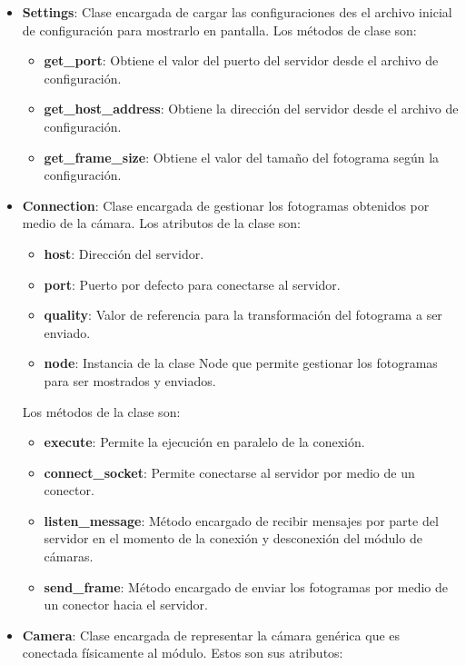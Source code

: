 \begin{itemize}
    \item \textbf{Settings}: Clase encargada de cargar las configuraciones des el archivo inicial de configuración para mostrarlo en pantalla. Los métodos de clase son:
        \begin{itemize}
            \item \textbf{get\_port}: Obtiene el valor del puerto del servidor desde el archivo de configuración.
            \item \textbf{get\_host\_address}: Obtiene la dirección del servidor desde el archivo de configuración.
            \item \textbf{get\_frame\_size}: Obtiene el valor del tamaño del fotograma según la configuración.
        \end{itemize}
    \item \textbf{Connection}: Clase encargada de gestionar los fotogramas obtenidos por medio de la cámara. Los atributos de la clase son:
        \begin{itemize}
            \item \textbf{host}: Dirección del servidor.
            \item \textbf{port}: Puerto por defecto para conectarse al servidor.
            \item \textbf{quality}: Valor de referencia para la transformación del fotograma a ser enviado.
            \item \textbf{node}: Instancia de la clase Node  que permite gestionar los fotogramas para ser mostrados y enviados.
        \end{itemize}
        Los métodos de la clase son:
        \begin{itemize}
            \item \textbf{execute}: Permite la ejecución en paralelo de la conexión.
            \item \textbf{connect\_socket}: Permite conectarse al servidor por medio de un conector.
            \item \textbf{listen\_message}: Método encargado de recibir mensajes por parte del servidor en el momento de la conexión y desconexión del módulo de cámaras.
            \item \textbf{send\_frame}: Método encargado de enviar los fotogramas por medio de un conector hacia el servidor.
        \end{itemize}
    \item \textbf{Camera}: Clase encargada de representar la cámara genérica que es conectada físicamente al módulo. Estos son sus atributos:

\end{itemize}
